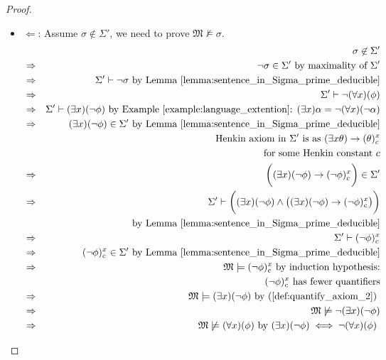 \documentclass[11pt,letterpaper]{book}
\theoremstyle{definition}
\begin{document}
\begin{enumerate}
\begin{proof}
\begin{enumerate}
{\begin{itemize}
{}
\item[]{$\Longleftarrow$: Assume $\sigma \not \in \Sigma'$, we need to
prove $\mathfrak{M} \not \models \sigma$.
\begin{eqnarray*}
& & \sigma \not \in \Sigma' \\
& \Rightarrow & \lnot \sigma \in \Sigma' \text{ by maximality of
$\Sigma'$} \\
& \Rightarrow & \Sigma' \vdash \lnot \sigma \text{ by Lemma
\ref{lemma:sentence_in_Sigma_prime_deducible}} \\
& \Rightarrow & \Sigma' \vdash \lnot (\forall x) ( \phi ) \\
& \Rightarrow & \Sigma' \vdash (\exists x ) (\lnot \phi ) \text{ by
Example \ref{example:language_extention}: $(\exists x) \alpha =
\lnot (\forall x) (\lnot \alpha) $} \\
& \Rightarrow & (\exists x ) (\lnot \phi ) \in \Sigma' \text{ by Lemma
\ref{lemma:sentence_in_Sigma_prime_deducible}} \\
& & \text{ Henkin axiom in $\Sigma'$ is as $(\exists x \theta )
\rightarrow (\theta)_c ^ x$} \\
& & \quad \text{for some Henkin constant $c$}  \\
& \Rightarrow & \bigg( (\exists x ) (\lnot \phi ) \rightarrow (\lnot
\phi )_c ^x \bigg) \in \Sigma' \\
& \Rightarrow & \Sigma' \vdash \bigg( (\exists x ) (\lnot \phi )  \land
\big( (\exists x ) (\lnot \phi ) \rightarrow ( \lnot \phi)_c ^x \big)
\bigg)\\
& & \quad \text{ by Lemma \ref{lemma:sentence_in_Sigma_prime_deducible}} \\
& \Rightarrow & \Sigma' \vdash (\lnot \phi)_c ^x \\
& \Rightarrow & (\lnot \phi)_c ^x \in \Sigma' \text{ by Lemma
\ref{lemma:sentence_in_Sigma_prime_deducible}} \\
& \Rightarrow & \mathfrak{M}  \models (\lnot \phi)_c ^x \text{ by
induction hypothesis:} \\
& & \quad \text{$( \lnot \phi)_c ^x$ has fewer quantifiers} \\
& \Rightarrow & \mathfrak{M} \models (\exists x) ( \lnot \phi) \text{ by
(\ref{def:quantify_axiom_2}) } \\
& \Rightarrow & \mathfrak{M} \not \models \lnot (\exists x) ( \lnot \phi) \\
& \Rightarrow & \mathfrak{M} \not \models (\forall x) (\phi) \text{ by $
(\exists x) ( \lnot \phi) \iff \lnot (\forall x) (\phi) $ }
\end{eqnarray*}

}
\end{itemize}

}

\end{enumerate}

\end{proof}

\end{enumerate}
\end{document}
